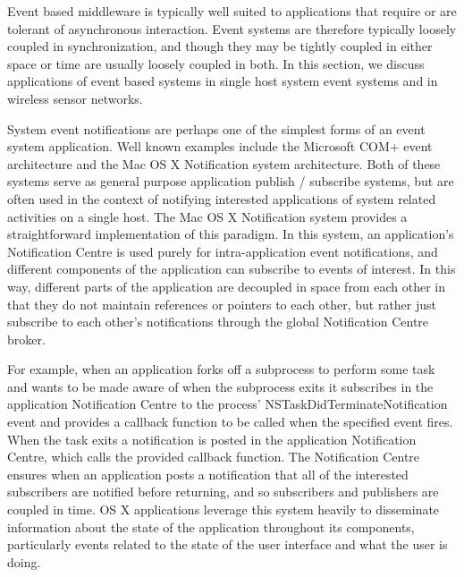 \documentclass{acm_proc_article-sp}
\begin{document}

Event based middleware is typically well suited to applications that require or are tolerant of asynchronous interaction. Event systems are therefore typically loosely coupled in synchronization, and though they may be tightly coupled in either space or time are usually loosely coupled in both. In this section, we discuss applications of event based systems in single host system event systems and in wireless sensor networks.

System event notifications are perhaps one of the simplest forms of an event system application. Well known examples include the Microsoft COM+ event architecture and the Mac OS X Notification system architecture. Both of these systems serve as general purpose application publish / subscribe systems, but are often used in the context of notifying interested applications of system related activities on a single host. The Mac OS X Notification system \cite{nsnotification} provides a straightforward implementation of this paradigm. In this system, an application's Notification Centre is used purely for intra-application event notifications, and different components of the application can subscribe to events of interest. In this way, different parts of the application are decoupled in space from each other in that they do not maintain references or pointers to each other, but rather just subscribe to each other's notifications through the global Notification Centre broker. 

For example, when an application forks off a subprocess to perform some task and wants to be made aware of when the subprocess exits it subscribes in the application Notification Centre to the process' NSTaskDidTerminateNotification event and provides a callback function to be called when the specified event fires. When the task exits a notification is posted in the application Notification Centre, which calls the provided callback function. The Notification Centre ensures when an application posts a notification that all of the interested subscribers are notified before returning, and so subscribers and publishers are coupled in time. OS X applications leverage this system heavily to disseminate information about the state of the application throughout its components, particularly events related to the state of the user interface and what the user is doing. 
\end{document}
